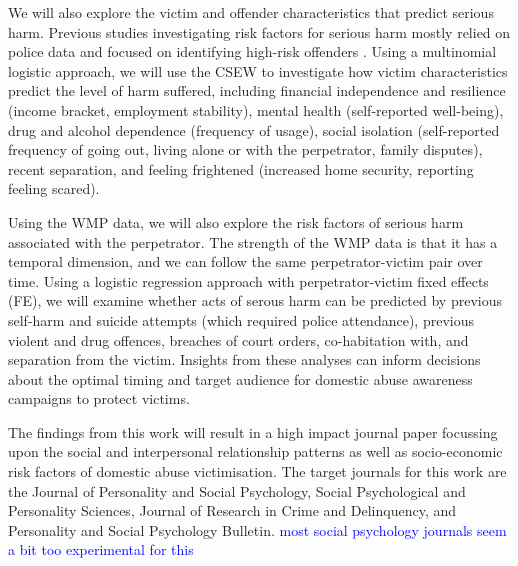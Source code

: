 \documentclass[11pt, a4paper]{article}
\newcommand{\TM}[1] {{\textcolor{orange}{#1}}}
\newcommand{\AT}[1] {{\textcolor{blue}{#1}}}
\begin{document}
 We will also explore the victim and offender characteristics that predict serious harm. Previous studies investigating risk factors for serious harm mostly relied on police data and focused on identifying high-risk offenders \cite{thornton}. Using a multinomial logistic approach, we will use the CSEW to investigate how victim characteristics predict the level of harm suffered, including financial independence and resilience (income bracket, employment stability), mental health (self-reported well-being), drug and alcohol dependence (frequency of usage), social isolation (self-reported frequency of going out, living alone or with the perpetrator, family disputes), recent separation, and feeling frightened (increased home security, reporting feeling scared).
 
 Using the WMP data, we will also explore the risk factors of serious harm associated with the perpetrator. The strength of the WMP data is that it has a temporal dimension, and we can follow the same perpetrator-victim pair over time. Using a logistic regression approach with perpetrator-victim fixed effects (FE), we will examine whether acts of serous harm can be predicted by previous self-harm and suicide attempts (which required police attendance), previous violent and drug offences, breaches of court orders, co-habitation with, and separation from the victim. Insights from these analyses can inform decisions about the optimal timing and target audience for domestic abuse awareness campaigns to protect victims. 
 
 The findings from this work will result in a high impact journal paper focussing upon the social and interpersonal relationship patterns as well as socio-economic risk factors of domestic abuse victimisation. The target journals for this work are the Journal of Personality and Social Psychology, Social Psychological and Personality Sciences, Journal of Research in Crime and Delinquency, and Personality and Social Psychology Bulletin. \AT{most social psychology journals seem a bit too experimental for this}
 
 


%
%
\end{document}
